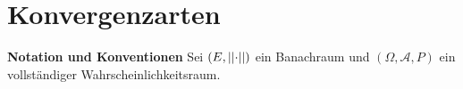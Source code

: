 \chapter{Konvergenzarten}
\textbf{Notation und Konventionen}\newline 
Sei $(E, \lvert\lvert \cdot \rvert\rvert)$ ein Banachraum und $(\Omega, \mathcal{A}, P)$ ein vollständiger Wahrscheinlichkeitsraum. 


